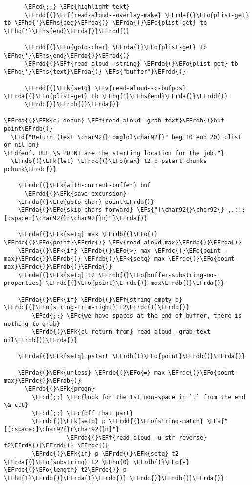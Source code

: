 \documentclass[a4wide,10pt]{article}
\newcommand{\EFc}[1]{\textcolor{EFc}{#1}} %
\newcommand{\EFcd}[1]{\textcolor{EFcd}{#1}} %
\newcommand{\EFs}[1]{\textcolor{EFs}{#1}} %
\newcommand{\EFd}[1]{\textcolor{EFd}{#1}} %
\newcommand{\EFk}[1]{\textcolor{EFk}{#1}} %
\newcommand{\EFf}[1]{\textcolor{EFf}{#1}} %
\newcommand{\EFv}[1]{\textcolor{EFv}{#1}} %
\newcommand{\EFo}[1]{\textcolor{EFo}{#1}} %
\newcommand{\EFhn}[1]{\textcolor{EFhn}{\textbf{#1}}} %
\newcommand{\EFhq}[1]{\textcolor{EFhq}{#1}} %
\newcommand{\EFhs}[1]{\textcolor{EFhs}{#1}} %
\newcommand{\EFrda}[1]{\textcolor{EFrda}{#1}} %
\newcommand{\EFrdb}[1]{\textcolor{EFrdb}{#1}} %
\newcommand{\EFrdc}[1]{\textcolor{EFrdc}{#1}} %
\newcommand{\EFrdd}[1]{\textcolor{EFrdd}{#1}} %
\begin{document}
\begin{Code}
\begin{Verbatim}
      \EFcd{;;} \EFc{highlight text}
      \EFrdd{(}\EFf{read-aloud--overlay-make} \EFrda{(}\EFo{plist-get} tb \EFhq{'}\EFhs{beg}\EFrda{)} \EFrda{(}\EFo{plist-get} tb \EFhq{'}\EFhs{end}\EFrda{)}\EFrdd{)}

      \EFrdd{(}\EFo{goto-char} \EFrda{(}\EFo{plist-get} tb \EFhq{'}\EFhs{end}\EFrda{)}\EFrdd{)}
      \EFrdd{(}\EFf{read-aloud--string} \EFrda{(}\EFo{plist-get} tb \EFhq{'}\EFhs{text}\EFrda{)} \EFs{"buffer"}\EFrdd{)}

      \EFrdd{(}\EFk{setq} \EFv{read-aloud--c-bufpos} \EFrda{(}\EFo{plist-get} tb \EFhq{'}\EFhs{end}\EFrda{)}\EFrdd{)}
      \EFrdc{)}\EFrdb{)}\EFrda{)}

\EFrda{(}\EFk{cl-defun} \EFf{read-aloud--grab-text}\EFrdb{(}buf point\EFrdb{)}
  \EFd{"Return (text \char92{}"omglol\char92{}" beg 10 end 20) plist or nil on}
\EFd{eof. BUF \& POINT are the starting location for the job."}
  \EFrdb{(}\EFk{let} \EFrdc{(}\EFo{max} t2 p pstart chunks pchunk\EFrdc{)}

    \EFrdc{(}\EFk{with-current-buffer} buf
      \EFrdd{(}\EFk{save-excursion}
	\EFrda{(}\EFo{goto-char} point\EFrda{)}
	\EFrda{(}\EFo{skip-chars-forward} \EFs{"[\char92{}\char92{}-,.:!;[:space:]\char92{}r\char92{}n]"}\EFrda{)}

	\EFrda{(}\EFk{setq} max \EFrdb{(}\EFo{+} \EFrdc{(}\EFo{point}\EFrdc{)} \EFv{read-aloud-max}\EFrdb{)}\EFrda{)}
	\EFrda{(}\EFk{if} \EFrdb{(}\EFo{>} max \EFrdc{(}\EFo{point-max}\EFrdc{)}\EFrdb{)} \EFrdb{(}\EFk{setq} max \EFrdc{(}\EFo{point-max}\EFrdc{)}\EFrdb{)}\EFrda{)}
	\EFrda{(}\EFk{setq} t2 \EFrdb{(}\EFo{buffer-substring-no-properties} \EFrdc{(}\EFo{point}\EFrdc{)} max\EFrdb{)}\EFrda{)}

	\EFrda{(}\EFk{if} \EFrdb{(}\EFf{string-empty-p} \EFrdc{(}\EFo{string-trim-right} t2\EFrdc{)}\EFrdb{)}
	    \EFcd{;;} \EFc{we have spaces at the end of buffer, there is nothing to grab}
	    \EFrdb{(}\EFk{cl-return-from} read-aloud--grab-text nil\EFrdb{)}\EFrda{)}

	\EFrda{(}\EFk{setq} pstart \EFrdb{(}\EFo{point}\EFrdb{)}\EFrda{)}

	\EFrda{(}\EFk{unless} \EFrdb{(}\EFo{=} max \EFrdc{(}\EFo{point-max}\EFrdc{)}\EFrdb{)}
	  \EFrdb{(}\EFk{progn}
	    \EFcd{;;} \EFc{look for the 1st non-space in `t` from the end \& cut}
	    \EFcd{;;} \EFc{off that part}
	    \EFrdc{(}\EFk{setq} p \EFrdd{(}\EFo{string-match} \EFs{"[[:space:]\char92{}r\char92{}n]"}
				  \EFrda{(}\EFf{read-aloud--u-str-reverse} t2\EFrda{)}\EFrdd{)} \EFrdc{)}
	    \EFrdc{(}\EFk{if} p \EFrdd{(}\EFk{setq} t2 \EFrda{(}\EFo{substring} t2 \EFhn{0} \EFrdb{(}\EFo{-} \EFrdc{(}\EFo{length} t2\EFrdc{)} p \EFhn{1}\EFrdb{)}\EFrda{)}\EFrdd{)} \EFrdc{)}\EFrdb{)}\EFrda{)}


\end{Verbatim}
\end{Code}
\end{document}
